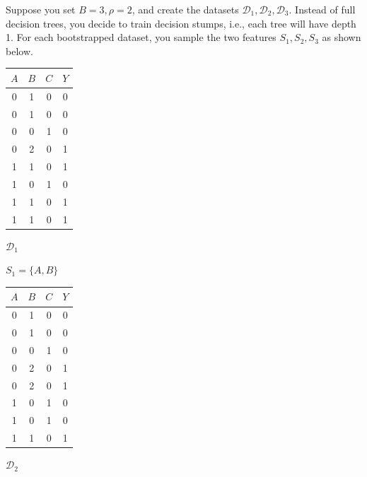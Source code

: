 \documentclass[11pt,addpoints,answers]{exam}
\begin{document}
\begin{questions}
\begin{parts}
Suppose you set $B = 3, \rho = 2$, and create the datasets $\mathcal{D}_1, \mathcal{D}_2, \mathcal{D}_3$. Instead of full decision trees, you decide to train decision stumps, i.e., each tree will have depth 1. For each bootstrapped dataset, you sample the two features $S_1, S_2, S_3$ as shown below.

\begin{table}[h]
\centering
    \parbox{.3\linewidth}{
    \center
    \begin{tabular}{|c|c|c|c|}
    \hline
    $A$ & $B$ & $C$ & $Y$ \\ \hline
    0 & 1 & 0 & 0     \\ \hline
    0 & 1 & 0 & 0     \\ \hline
    0 & 0 & 1 & 0     \\ \hline
    0 & 2 & 0 & 1     \\ \hline
    1 & 1 & 0 & 1     \\ \hline
    1 & 0 & 1 & 0     \\ \hline
    1 & 1 & 0 & 1     \\ \hline
    1 & 1 & 0 & 1     \\ \hline
    \end{tabular}
    \vspace{1em}
    
    $\mathcal{D}_1$
    
    $S_1 = \{A, B\}$}
    \parbox{.3\linewidth}{
    \center
    \begin{tabular}{|c|c|c|c|}
    \hline
    $A$ & $B$ & $C$ & $Y$ \\ \hline
    0 & 1 & 0 & 0     \\ \hline
    0 & 1 & 0 & 0     \\ \hline
    0 & 0 & 1 & 0     \\ \hline
    0 & 2 & 0 & 1     \\ \hline
    0 & 2 & 0 & 1     \\ \hline
    1 & 0 & 1 & 0     \\ \hline
    1 & 0 & 1 & 0     \\ \hline
    1 & 1 & 0 & 1     \\ \hline
    \end{tabular}
    \vspace{1em}
    
    $\mathcal{D}_2$
    
}
\end{table}
\end{parts}
\end{questions}
\end{document}
